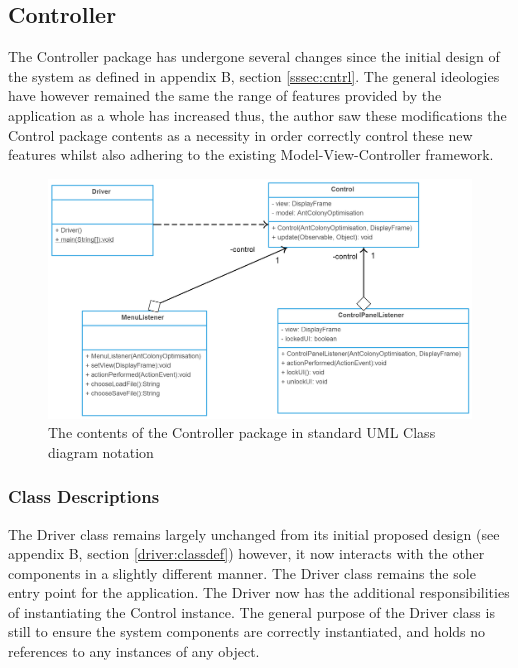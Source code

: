 \subsection{Controller}

The Controller package has undergone several changes since the initial design of the system as defined in appendix B, section \ref{sssec:cntrl}. The general ideologies have however remained the same the range of features provided by the application as a whole has increased thus, the author saw these modifications the Control package contents as a necessity in order correctly control these new features whilst also adhering to the existing Model-View-Controller framework.

\begin{figure}[H]
\centering
\includegraphics[scale=0.23]{Images/chapter4/controller}
\caption[Control Package Class Diagram]{The contents of the Controller package in standard UML Class diagram notation}
\label{fig:controllerImp}
\end{figure}

\subsubsection{Class Descriptions}

The Driver class remains largely unchanged from its initial proposed design (see appendix B, section \ref{driver:classdef}) however, it now interacts with the other components in a slightly different manner. The Driver class remains the sole entry point for the application. The Driver now has the additional responsibilities of instantiating the Control instance. The general purpose of the Driver class is still to ensure the system components are correctly instantiated, and holds no references to any instances of any object.

